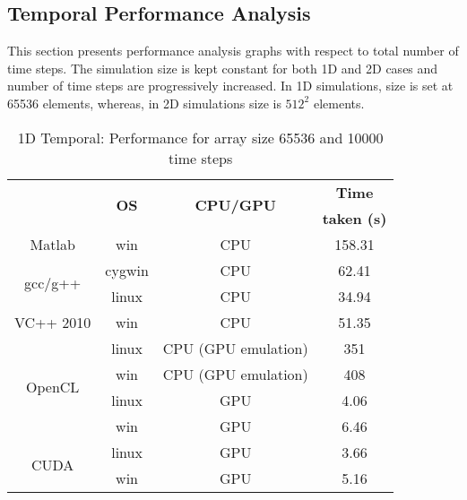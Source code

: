 \subsection{Temporal Performance Analysis}
This section presents performance analysis graphs with respect to total number of time steps. The simulation size is kept constant for both 1D and 2D cases and number of time steps are progressively increased. In 1D simulations, size is set at 65536 elements, whereas, in 2D simulations size is $512^2$ elements.
\begin{table}[H]
\begin{center}
\vspace{0.3cm}
	\begin{tabular}{cccc}
	\hline \hline
		\rule{0pt}{2.6ex} & \multirow{2}{*}{\textbf{OS}} & \multirow{2}{*}{\textbf{CPU/GPU}}  & \textbf{Time}\\
		& &  & \textbf{taken (s)}\\
		\hline
		Matlab \rule{0pt}{2.6ex} & win & CPU &158.31\\
		\hline
		\multirow{2}{*}{gcc/g++} \rule{0pt}{2.6ex} & cygwin & CPU &62.41\\
		& linux & CPU &34.94\\
		\hline
		VC++ 2010 \rule{0pt}{2.6ex} & win & CPU &51.35\\
		\hline
		\multirow{4}{*}{OpenCL} \rule{0pt}{2.6ex} & linux & CPU (GPU emulation) &351\\
		& win & CPU (GPU emulation) &408\\
		& linux & GPU &4.06\\
		& win & GPU &6.46\\
		\hline
		\multirow{2}{*}{CUDA} \rule{0pt}{2.6ex} & linux & GPU &3.66\\
		& win & GPU &5.16\\
	\hline \hline
	\end{tabular}
\end{center}
\caption{1D Temporal: Performance for array size 65536 and 10000 time steps}
\label{Tab:Performance-1D-time-10000-steps}
\end{table}

